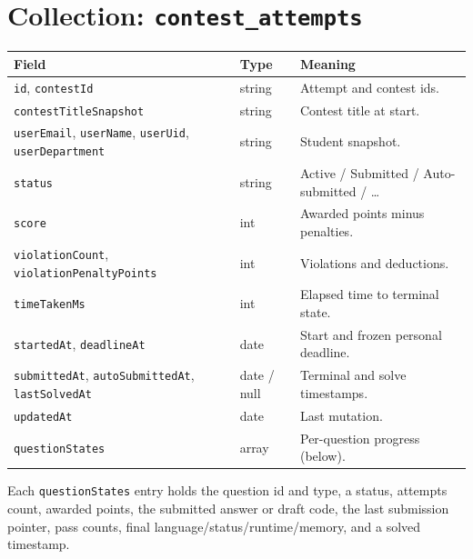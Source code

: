 \documentclass[12pt,a4paper,oneside]{report}
\newcommand{\code}[1]{\texttt{#1}}
\begin{document}
\section{Collection: \code{contest\_attempts}}
\begin{xltabular}{\linewidth}{@{}l l X@{}}
\toprule
\textbf{Field} & \textbf{Type} & \textbf{Meaning}\\
\midrule
\endhead
\code{id}, \code{contestId} & string & Attempt and contest ids.\\
\code{contestTitleSnapshot} & string & Contest title at start.\\
\code{userEmail}, \code{userName}, \code{userUid}, \code{userDepartment} & string & Student snapshot.\\
\code{status} & string & Active / Submitted / Auto-submitted / \ldots\\
\code{score} & int & Awarded points minus penalties.\\
\code{violationCount}, \code{violationPenaltyPoints} & int & Violations and deductions.\\
\code{timeTakenMs} & int & Elapsed time to terminal state.\\
\code{startedAt}, \code{deadlineAt} & date & Start and frozen personal deadline.\\
\code{submittedAt}, \code{autoSubmittedAt}, \code{lastSolvedAt} & date / null & Terminal and solve timestamps.\\
\code{updatedAt} & date & Last mutation.\\
\code{questionStates} & array & Per-question progress (below).\\
\bottomrule
\end{xltabular}

\noindent Each \code{questionStates} entry holds the question id and type, a
status, attempts count, awarded points, the submitted answer or draft code, the
last submission pointer, pass counts, final language/status/runtime/memory, and a
solved timestamp.
\end{document}
